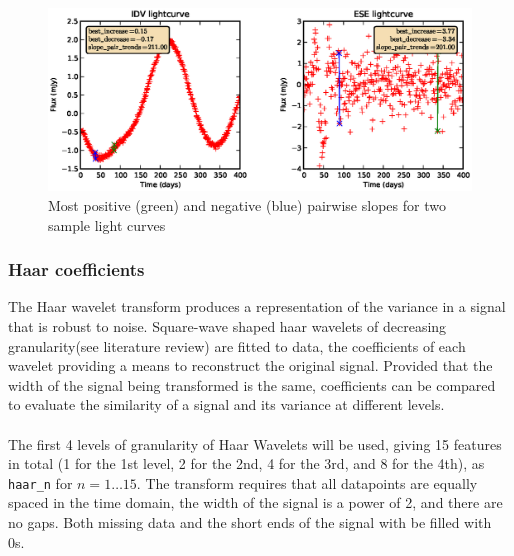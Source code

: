 \documentclass[10pt]{report}
\begin{document}
	\begin{figure}[ht!]
		\label{fig:slopesample}
		\includegraphics[width=\textwidth]{figures/slope_demo.eps}
		\caption{Most positive (green) and negative (blue) pairwise slopes for two sample light curves}
	\end{figure}
	
	\subsubsection{Haar coefficients}
	The Haar wavelet transform produces a representation of the variance in a signal that is robust to noise. Square-wave shaped haar wavelets of decreasing granularity(see literature review) are fitted to data, the coefficients of each wavelet providing a means to reconstruct the original signal. Provided that the width of the signal being transformed is the same, coefficients can be compared to evaluate the similarity of a signal and its variance at different levels. \\ \\ %
	The first 4 levels of granularity of Haar Wavelets will be used, giving 15 features in total (1 for the 1st level, 2 for the 2nd, 4 for the 3rd, and 8 for the 4th), as \verb#haar_n# for $n = 1 \ldots 15$. The transform requires that all datapoints are equally spaced in the time domain, the width of the signal is a power of 2, and there are no gaps. Both missing data and the short ends of the signal with be filled with 0s.
	
\end{document}
